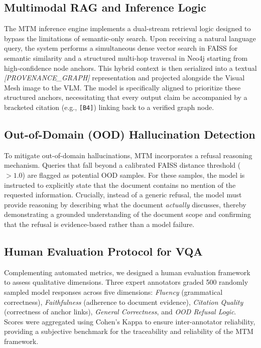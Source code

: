 \documentclass[11pt]{article}
\begin{document}
\subsection{Multimodal RAG and Inference Logic}
The MTM inference engine implements a dual-stream retrieval logic designed to bypass the limitations of semantic-only search. Upon receiving a natural language query, the system performs a simultaneous dense vector search in FAISS for semantic similarity and a structured multi-hop traversal in Neo4j starting from high-confidence node anchors. This hybrid context is then serialized into a textual \textit{[PROVENANCE\_GRAPH]} representation and projected alongside the Visual Mesh image to the VLM. The model is specifically aligned to prioritize these structured anchors, necessitating that every output claim be accompanied by a bracketed citation (e.g., \texttt{[B4]}) linking back to a verified graph node.

\subsection{Out-of-Domain (OOD) Hallucination Detection}
To mitigate out-of-domain hallucinations, MTM incorporates a refusal reasoning mechanism. Queries that fall beyond a calibrated FAISS distance threshold ($> 1.0$) are flagged as potential OOD samples. For these samples, the model is instructed to explicitly state that the document contains no mention of the requested information. Crucially, instead of a generic refusal, the model must provide reasoning by describing what the document \textit{actually} discusses, thereby demonstrating a grounded understanding of the document scope and confirming that the refusal is evidence-based rather than a model failure.

\subsection{Human Evaluation Protocol for VQA}
Complementing automated metrics, we designed a human evaluation framework to assess qualitative dimensions. Three expert annotators graded 500 randomly sampled model responses across five dimensions: \textit{Fluency} (grammatical correctness), \textit{Faithfulness} (adherence to document evidence), \textit{Citation Quality} (correctness of anchor links), \textit{General Correctness}, and \textit{OOD Refusal Logic}. Scores were aggregated using Cohen’s Kappa to ensure inter-annotator reliability, providing a subjective benchmark for the traceability and reliability of the MTM framework.
\end{document}
